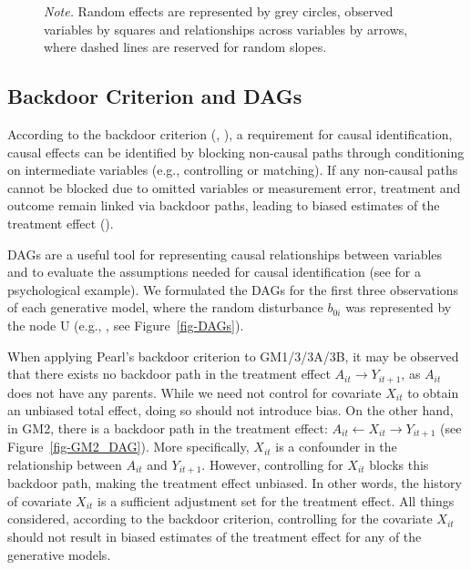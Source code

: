 \documentclass[
  12pt,
  a4paper,
]{article}
\begin{document}
\begin{figure}[H]
\begin{minipage}{0.50\linewidth}
{}

\end{minipage}%
%
\begin{minipage}{0.50\linewidth}
\emph{Note.} Random effects are represented by grey circles, observed
variables by squares and relationships across variables by arrows, where
dashed lines are reserved for random slopes.\end{minipage}%

\end{figure}%

\subsection{Backdoor Criterion and
DAGs}\label{backdoor-criterion-and-dags}

According to the backdoor criterion (, ), a requirement for causal
identification, causal effects can be identified by blocking non-causal
paths through conditioning on intermediate variables (e.g., controlling
or matching). If any non-causal paths cannot be blocked due to omitted
variables or measurement error, treatment and outcome remain linked via
backdoor paths, leading to biased estimates of the treatment effect
().

DAGs are a useful tool for representing causal relationships between
variables and to evaluate the assumptions needed for causal
identification (see 
for a psychological example). We formulated the DAGs for the first three
observations of each generative model, where the random disturbance
\(b_{0i}\) was represented by the node U (e.g.,
, see
Figure~\ref{fig-DAGs}).

When applying Pearl's backdoor criterion to GM1/3/3A/3B, it may be
observed that there exists no backdoor path in the treatment effect
\(A_{it} \to Y_{it+1}\), as \(A_{it}\) does not have any parents. While
we need not control for covariate \(X_{it}\) to obtain an unbiased total
effect, doing so should not introduce bias. On the other hand, in GM2,
there is a backdoor path in the treatment effect:
\(A_{it} \leftarrow X_{it} \rightarrow Y_{it+1}\) (see
Figure~\ref{fig-GM2_DAG}). More specifically, \(X_{it}\) is a confounder
in the relationship between \(A_{it}\) and \(Y_{it+1}\). However,
controlling for \(X_{it}\) blocks this backdoor path, making the
treatment effect unbiased. In other words, the history of covariate
\(X_{it}\) is a sufficient adjustment set for the treatment effect. All
things considered, according to the backdoor criterion, controlling for
the covariate \(X_{it}\) should not result in biased estimates of the
treatment effect for any of the generative models.
\end{document}
